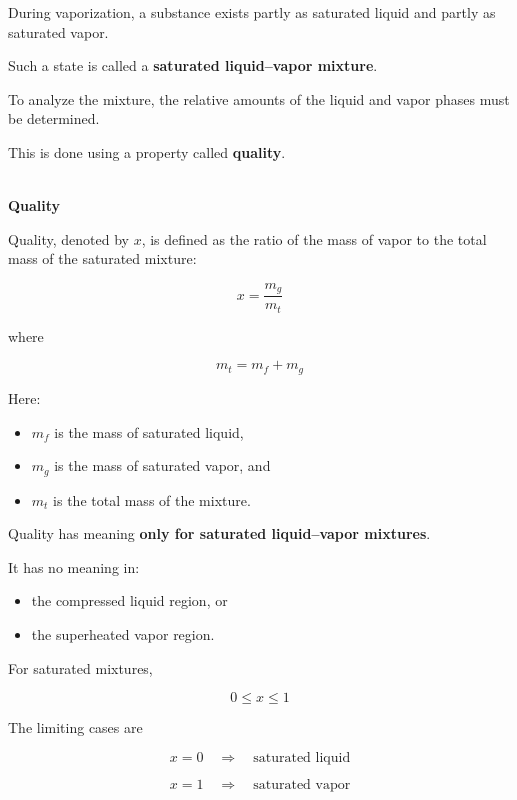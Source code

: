 \documentclass[12pt]{article}
\begin{document}
During vaporization, a substance exists partly as saturated liquid and partly as saturated vapor.

Such a state is called a \textbf{saturated liquid--vapor mixture}.

To analyze the mixture, the relative amounts of the liquid and vapor phases must be determined.

This is done using a property called \textbf{quality}.

\textbf{\\ Quality}

Quality, denoted by $x$, is defined as the ratio of the mass of vapor to the total mass of the saturated mixture:

\begin{equation*}
\boxed{x=\frac{m_g}{m_t}}
\end{equation*}

where

\begin{equation*}
m_t=m_f+m_g
\end{equation*}

Here:
\begin{itemize}
    \item $m_f$ is the mass of saturated liquid,
    \item $m_g$ is the mass of saturated vapor, and
    \item $m_t$ is the total mass of the mixture.
\end{itemize}

Quality has meaning \textbf{only for saturated liquid--vapor mixtures}.

It has no meaning in:
\begin{itemize}
    \item the compressed liquid region, or
    \item the superheated vapor region.
\end{itemize}

For saturated mixtures,

\begin{equation*}
\boxed{0\leq x\leq 1}
\end{equation*}

The limiting cases are

\begin{equation*}
x=0
\quad\Rightarrow\quad
\text{saturated liquid}
\end{equation*}

\begin{equation*}
x=1
\quad\Rightarrow\quad
\text{saturated vapor}
\end{equation*}
\end{document}
